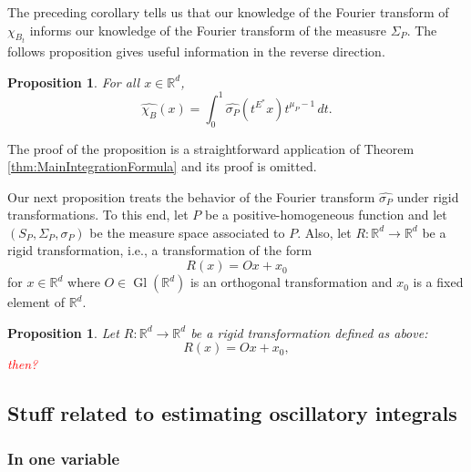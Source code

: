 \documentclass[11pt]{article}
\newtheorem{proposition}[theorem]{Proposition}
\newcommand\Gl{\operatorname{Gl}} %
\newcommand\R{\mathbb{R}}
\begin{document}
\noindent The preceding corollary tells us that our knowledge of the Fourier transform of $\chi_{B_t}$ informs our knowledge of the Fourier transform of the measusre $\Sigma_P$. The follows proposition gives useful information in the reverse direction.
\begin{proposition}
For all $x\in\mathbb{R}^d$,
\begin{equation*}
    \widehat{\chi_B}(x)=\int_0^1 \widehat{\sigma_P}(t^{E^*}x) t^{\mu_P-1}\,dt.
\end{equation*}
\end{proposition}
The proof of the proposition is a straightforward application of Theorem \ref{thm:MainIntegrationFormula} and its proof is omitted.


Our next proposition treats the behavior of the Fourier transform $\widehat{\sigma_P}$ under rigid transformations. To this end, let $P$ be a positive-homogeneous function and let $(S_P,\Sigma_P,\sigma_P)$ be the measure space associated to $P$. Also, let $R:\mathbb{R}^d\to\mathbb{R}^d$ be a rigid transformation, i.e., a transformation of the form
\begin{equation*}
    R(x)=Ox+x_0
\end{equation*}
for $x\in\mathbb{R}^d$ where $O\in\Gl(\mathbb{R}^d)$ is an orthogonal transformation and $x_0$ is a fixed element of $\mathbb{R}^d$.

\begin{proposition}
Let $R : \R^d \to \R^d$ be a rigid transformation defined as above: 
\begin{equation*}
    R(x) = Ox + x_0,
\end{equation*}
\textcolor{red}{then?}
\end{proposition}







\subsection{Stuff related to estimating oscillatory integrals}


\subsubsection{In one variable}
\end{document}
